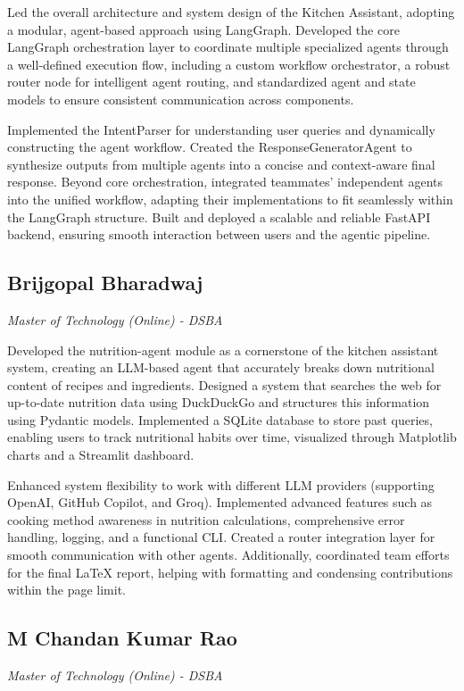 \documentclass{ecai}
\begin{document}
Led the overall architecture and system design of the Kitchen Assistant, adopting a modular, agent-based approach using LangGraph. Developed the core LangGraph orchestration layer to coordinate multiple specialized agents through a well-defined execution flow, including a custom workflow orchestrator, a robust router node for intelligent agent routing, and standardized agent and state models to ensure consistent communication across components.

Implemented the IntentParser for understanding user queries and dynamically constructing the agent workflow. Created the ResponseGeneratorAgent to synthesize outputs from multiple agents into a concise and context-aware final response. Beyond core orchestration, integrated teammates' independent agents into the unified workflow, adapting their implementations to fit seamlessly within the LangGraph structure. Built and deployed a scalable and reliable FastAPI backend, ensuring smooth interaction between users and the agentic pipeline.

\subsection*{Brijgopal Bharadwaj}
\textit{Master of Technology (Online) - DSBA}

Developed the nutrition-agent module as a cornerstone of the kitchen assistant system, creating an LLM-based agent that accurately breaks down nutritional content of recipes and ingredients. Designed a system that searches the web for up-to-date nutrition data using DuckDuckGo and structures this information using Pydantic models. Implemented a SQLite database to store past queries, enabling users to track nutritional habits over time, visualized through Matplotlib charts and a Streamlit dashboard.

Enhanced system flexibility to work with different LLM providers (supporting OpenAI, GitHub Copilot, and Groq). Implemented advanced features such as cooking method awareness in nutrition calculations, comprehensive error handling, logging, and a functional CLI. Created a router integration layer for smooth communication with other agents. Additionally, coordinated team efforts for the final LaTeX report, helping with formatting and condensing contributions within the page limit.

\subsection*{M Chandan Kumar Rao}
\textit{Master of Technology (Online) - DSBA}
\end{document}

